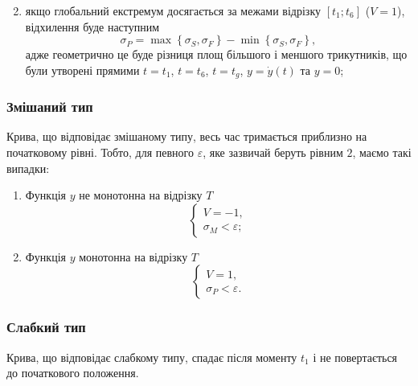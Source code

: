 \begin{enumerate}
\begin{equation*}
    \end{equation*}
  \item
    якщо глобальний екстремум досягається за межами відрізку
    $\left[ t_1; t_6 \right]$ ($V=1$), відхилення буде наступним
    \begin{equation*}
      \sigma_P %
      = \max{\left\{ \sigma_S, \sigma_F \right\}}
        - \min{\left\{ \sigma_S, \sigma_F \right\}},
    \end{equation*}
    адже геометрично це буде різниця площ більшого і меншого трикутників,
    що були утворені прямими
    $t=t_1$, $t=t_6$, $t=t_g$, $y=\dot{y}\left( t \right)$ та $y=0$;
\end{enumerate}


\subsubsection{Змішаний тип}
Крива, що відповідає змішаному типу, весь час тримається приблизно на
початковому рівні.
Тобто, для певного $\varepsilon$, яке зазвичай беруть рівним $2$,
маємо такі випадки:
\begin{enumerate}
  \item
    Функція $y$ не монотонна на відрізку $T$
    \begin{equation*}
      \begin{cases}
        V = -1, \\
        \sigma_M < \varepsilon;
      \end{cases}
    \end{equation*}
  \item
    Функція $y$ монотонна на відрізку $T$
    \begin{equation*}
      \begin{cases}
        V = 1, \\
        \sigma_P < \varepsilon.
      \end{cases}
    \end{equation*}
\end{enumerate}

\subsubsection{Слабкий тип}
Крива, що відповідає слабкому типу, спадає після моменту $t_1$
і не повертається до початкового положення.


